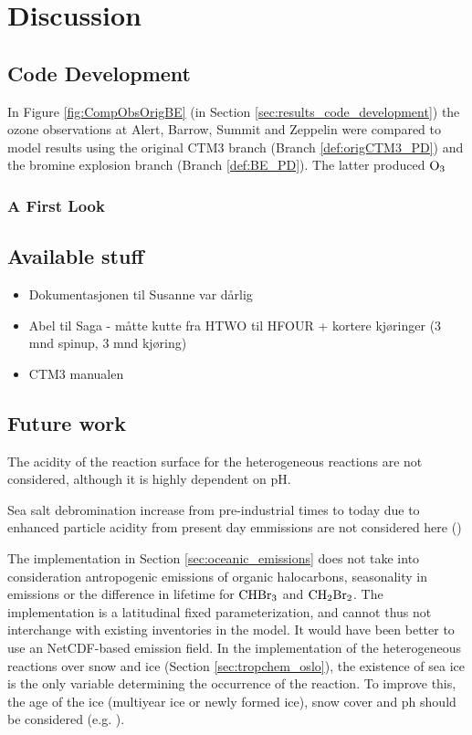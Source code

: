 \setcounter{chapter}{7}
\chapter{Discussion}

\section{Code Development}\label{sec:discussion_code_development}

In Figure \ref{fig:CompObsOrigBE} (in Section \ref{sec:results_code_development}) the ozone observations at Alert, Barrow, Summit and Zeppelin were compared to model results using the original CTM3 branch (Branch \ref{def:origCTM3_PD}) and the bromine explosion branch (Branch \ref{def:BE_PD}). The latter produced $\mathrm{O_3}$


\subsection{A First Look}


\section{Available stuff}

\begin{itemize}
    \item Dokumentasjonen til Susanne var dårlig
    \item Abel til Saga - måtte kutte fra HTWO til HFOUR + kortere kjøringer (3 mnd spinup, 3 mnd kjøring)
    \item CTM3 manualen
\end{itemize}

\section{Future work}

The acidity of the reaction surface for the heterogeneous reactions are not considered, although it is highly dependent on pH. 

\medskip
Sea salt debromination increase from pre-industrial times to today due to enhanced particle acidity from present day emmissions are not considered here (\cite{Parella})

\medskip
The implementation in Section \ref{sec:oceanic_emissions} does not take into consideration antropogenic emissions of organic halocarbons, seasonality in emissions or the difference in lifetime for $\mathrm{CHBr_3}$ and $\mathrm{CH_2Br_2}$. The implementation is a latitudinal fixed parameterization, and cannot thus not interchange with existing inventories in the model. It would have been better to use an NetCDF-based emission field. 
\medskip
In the implementation of the heterogeneous reactions over snow and ice (Section \ref{sec:tropchem_oslo}), the existence of sea ice is the only variable determining the occurrence of the reaction. To improve this, the age of the ice (multiyear ice or newly formed ice), snow cover and ph should be considered (e.g. \cite{Peterson2019}).


